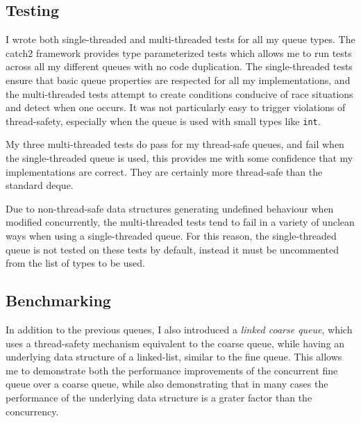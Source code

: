 \documentclass{article}
\begin{document}
\subsection{Testing}
I wrote both single-threaded and multi-threaded tests for all my queue types.
The catch2 framework provides type parameterized tests which allows me to run
tests across all my different queues with no code duplication. The
single-threaded tests ensure that basic queue properties are respected for all
my implementations, and the multi-threaded tests attempt to create conditions
conducive of race situations and detect when one occurs. It was not particularly
easy to trigger violations of thread-safety, especially when the queue is used
with small types like \verb|int|.

My three multi-threaded tests do pass for my thread-safe queues, and fail when
the single-threaded queue is used, this provides me with some confidence that my
implementations are correct. They are certainly more thread-safe than the
standard deque. 

Due to non-thread-safe data structures generating undefined behaviour when
modified concurrently, the multi-threaded tests tend to fail in a variety of
unclean ways when using a single-threaded queue. For this reason, the
single-threaded queue is not tested on these tests by default, instead it must
be uncommented from the list of types to be used.

\subsection{Benchmarking}
In addition to the previous queues, I also introduced a \textit{linked coarse
queue}, which uses a thread-safety mechanism equivalent to the coarse queue,
while having an underlying data structure of a linked-list, similar to the fine
queue. This allows me to demonstrate both the performance improvements of the
concurrent fine queue over a coarse queue, while also demonstrating that in many
cases the performance of the underlying data structure is a grater factor than
the concurrency.
\end{document}

